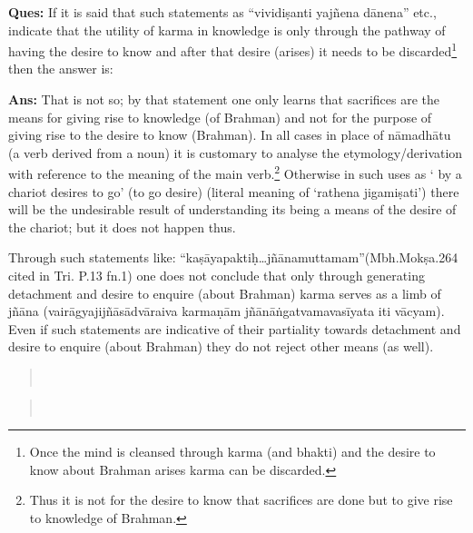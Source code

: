 \textbf{Ques:} If it is said that such statements as “vividiṣanti yajñena dānena” etc., indicate that the utility of karma in knowledge is only through the pathway of having the desire to know and after that desire (arises) it needs to be discarded\footnote{Once the mind is cleansed through karma (and bhakti) and the desire to know about Brahman arises karma can be discarded.} then the answer is:

\textbf{Ans:} That is not so; by that statement one only learns that sacrifices are the means for giving rise to knowledge (of Brahman) and not for the purpose of giving rise to the desire to know (Brahman). In all cases in place of nāmadhātu (a verb derived from a noun) it is customary to analyse the etymology/derivation with reference to the meaning of the main verb.\footnote{Thus it is not for the desire to know that sacrifices are done but to give rise to knowledge of Brahman.} Otherwise in such uses as ‘ by a chariot desires to go’ (to go desire) (literal meaning of ‘rathena jigamiṣati’) there will be the undesirable result of understanding its being  a means of the desire of the chariot; but it does not happen thus.

Through such statements like: “kaṣāyapaktiḥ…jñānamuttamam”\break (Mbh.Mokṣa.264 cited in Tri. P.13 fn.1) one does not conclude that only through generating detachment and desire to enquire (about Brahman) karma serves as a limb of jñāna (vairāgyajijñāsādvāraiva karmaṇām jñānāṅgatvamavasīyata iti vācyam). Even if such statements are indicative of their partiality towards detachment and desire to enquire (about Brahman) they do not reject other means (as well).
\begin{verse}
\\
\end{verse}
\begin{verse}
\\
\end{verse}

